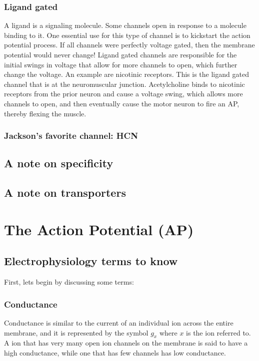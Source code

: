\documentclass[12pt]{amsart}
\begin{document}
\subsubsection{Ligand gated} A ligand is a signaling molecule. Some channels open in response to a molecule binding to it. One essential use for this type of channel is to kickstart the action potential process. If all channels were perfectly voltage gated, then the membrane potential would never change! Ligand gated channels are responsible for the initial swings in voltage that allow for more channels to open, which further change the voltage. An example are nicotinic receptors. This is the ligand gated channel that is at the neuromuscular junction. Acetylcholine binds to nicotinic receptors from the prior neuron and cause a voltage swing, which allows more channels to open, and then eventually cause the motor neuron to fire an AP, thereby flexing the muscle. 


\subsubsection{Jackson's favorite channel: HCN}
\subsection{A note on specificity}
\subsection{A note on transporters}


\section{The Action Potential (AP)}

\subsection{Electrophysiology terms to know} First, lets begin by discussing some terms: 

\subsubsection{Conductance} Conductance is similar to the current of an individual ion across the entire membrane, and it is represented by the symbol $g_x$ where $x$ is the ion referred to. A ion that has very many open ion channels on the membrane is said to have a high conductance, while one that has few channels has low conductance. 
\end{document}
